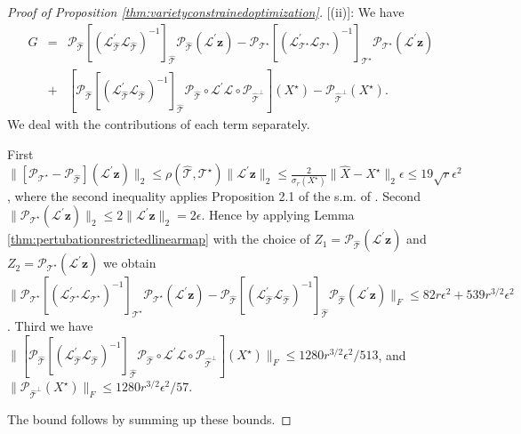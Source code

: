 \documentclass[11pt,letterpaper]{article}
\newcommand{\bz}{\mathbf{z}}
\newcommand{\ct}{\mathcal{T}}
\newcommand{\cp}{\mathcal{P}}
\begin{document}
\begin{proof}[Proof of Proposition \ref{thm:varietyconstrainedoptimization}]
	[(ii)]: We have 
	\begin{eqnarray*}
		G & = & \cp_{\hat{\ct}} [(\mathcal{L}^{\prime}_{\hat{\ct}}\mathcal{L}_{\hat{\ct}})^{-1}]_{\hat{\ct}} \cp_{\hat{\ct}} (\mathcal{L}^{\prime} \bz) - \cp_{\ct^{\star}} [(\mathcal{L}^{\prime}_{\ct^{\star}}\mathcal{L}_{\ct^{\star}})^{-1}]_{\ct^{\star}} \cp_{\ct^{\star}} ( \mathcal{L}^{\prime} \bz) \\
		& + &  [\cp_{\hat{\ct}} [(\mathcal{L}^{\prime}_{\hat{\ct}}\mathcal{L}_{\hat{\ct}})^{-1}]_{\hat{\ct}} \cp_{\hat{\ct}} \circ \mathcal{L}^{\prime} \mathcal{L} \circ \cp_{\hat{\ct}^{\perp}}] (X^{\star})  - \cp_{\hat{\ct}^{\perp}} (X^{\star}).
	\end{eqnarray*}
	We deal with the contributions of each term separately. 
	
	First $\| [\cp_{\ct^{\star}} - \cp_{\hat{\ct}}] (\mathcal{L}^{\prime} \bz) \|_2 \leq \rho(\hat{\ct},\ct^{\star}) \| \mathcal{L}^{\prime} \bz\|_2 \leq \frac{2}{\sigma_{r}(X^{\star})} \| \hat{X} - X^{\star} \|_2 \epsilon \leq 19 \sqrt{r} \epsilon^2$, where the second inequality applies Proposition 2.1 of the s.m. of \cite{CPW:12}.  Second $\|\cp_{\ct^{\star}} (\mathcal{L}^{\prime} \bz)\|_2 \leq 2\|\mathcal{L}^{\prime} \bz\|_2 = 2 \epsilon$. Hence by applying Lemma \ref{thm:pertubationrestrictedlinearmap} with the choice of $Z_1 = \cp_{\hat{\ct}}(\mathcal{L}^{\prime} \bz)$ and $Z_2 = \cp_{\ct^{\star}} (\mathcal{L}^{\prime} \bz)$ we obtain $\| \cp_{\ct^{\star}} [(\mathcal{L}^{\prime}_{\ct^{\star}}\mathcal{L}_{\ct^{\star}})^{-1}]_{\ct^{\star}} \cp_{\ct^{\star}} (\mathcal{L}^{\prime} \bz) - \cp_{\hat{\ct}} [(\mathcal{L}^{\prime}_{\hat{\ct}}\mathcal{L}_{\hat{\ct}})^{-1}]_{\hat{\ct}} \cp_{\hat{\ct}} (\mathcal{L}^{\prime} \bz )\|_F \leq 82 r \epsilon^2 + 539 r^{3/2} \epsilon^2$.  Third we have  $\| [\cp_{\hat{\ct}} [(\mathcal{L}^{\prime}_{\hat{\ct}}\mathcal{L}_{\hat{\ct}})^{-1}]_{\hat{\ct}} \cp_{\hat{\ct}} \circ \mathcal{L}^{\prime} \mathcal{L} \circ \cp_{\hat{\ct}^{\perp}}] (X^{\star}) \|_{F} \leq 1280 r^{3/2} \epsilon^2 / 513$, and $\|\cp_{\hat{\ct}^{\perp}}(X^{\star})\|_F \leq 1280 r^{3/2} \epsilon^2 / 57$.
	
	The bound follows by summing up these bounds.
\end{proof}
\end{document}
